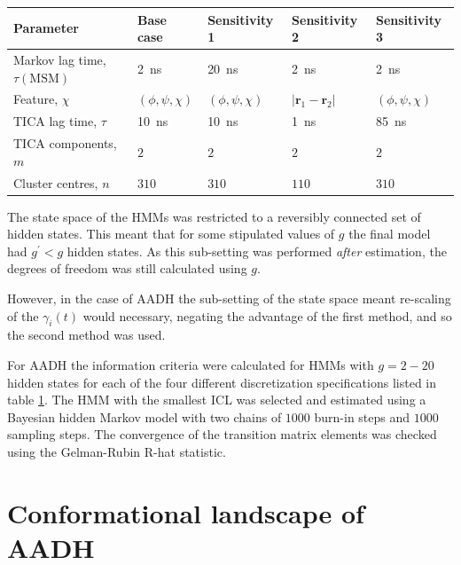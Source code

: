 \begin{table}
    \centering
    \begin{tabular}{|l|l|l|l|l|}
        \hline
        Parameter & Base case & Sensitivity 1 & Sensitivity 2 & Sensitivity 3 \\
        \hline\hline
        Markov lag time, $\tau(\textrm{MSM})$ & \SI{2}{\nano\second} &  \SI{20}{\nano\second}& \SI{2}{\nano\second}& \SI{2}{\nano\second} \\
        Feature, $\chi$ & $(\phi, \psi, \chi)$ & $(\phi, \psi, \chi)$ & $|\mathbf{r}_{1}-\mathbf{r}_2|$ & $(\phi, \psi, \chi)$ \\
        TICA lag time, $\tau$ & \SI{10}{\nano\second} & \SI{10}{\nano\second}&\SI{1}{\nano\second} &\SI{85}{\nano\second} \\
        TICA components, $m$ & $2$ & $2$ & $2$ & $2$ \\
        Cluster centres, $n$ & $310$ & $310$ & $110$ & $310$ \\
        \hline
    \end{tabular}
    \label{tab:aadh_final_msm_specs}
\end{table}



The state space of the HMMs was restricted to a reversibly connected set of  hidden states. This meant that for some stipulated values of $g$ the final model had $g^{\prime}<g$ hidden states. As this sub-setting was performed \emph{after} estimation, the degrees of freedom was still calculated using $g$. 

However, in the case of AADH the sub-setting of the state space meant re-scaling of the $\gamma_{i}(t)$ would necessary, negating the advantage of the first method, and so the second method was used. 

For AADH the information criteria were calculated for HMMs with $g = 2 - 20$ hidden states for each of the four different discretization specifications listed in table \ref{tab:aadh_final_msm_specs}.  The HMM with the smallest ICL was selected and estimated using a Bayesian hidden Markov model with two chains of  $1000$ burn-in steps and $1000$ sampling steps. The convergence of the transition matrix elements was checked using the Gelman-Rubin R-hat statistic. 

\section{Conformational landscape of AADH}


